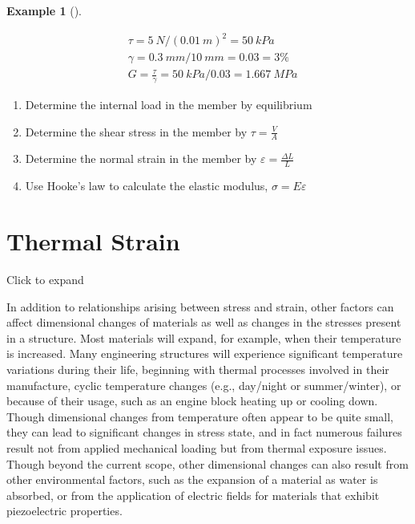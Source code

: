 \documentclass[
  letterpaper,
  DIV=11,
  numbers=noendperiod]{scrreprt}
\providecommand{\tightlist}{%
  \setlength{\itemsep}{0pt}\setlength{\parskip}{0pt}}\usepackage{longtable,booktabs,array}
\theoremstyle{definition}
\newtheorem{example}{Example}[chapter]
\theoremstyle{remark}
\begin{document}
\begin{tcolorbox}
\begin{example}[]
\begin{tcolorbox}
\[
\begin{aligned}
& \tau=5{~N} /(0.01{~m})^2=50{~kPa} \\
& \gamma=0.3{~mm}/10{~mm}=0.03=3 \% \\
& G=\frac{\tau}{\gamma}=50{~kPa}/0.03=1.667{~MPa}
\end{aligned}
\]

\end{tcolorbox}

\end{example}

\end{tcolorbox}

\begin{tcolorbox}[enhanced jigsaw, colback=white, colframe=quarto-callout-warning-color-frame, toptitle=1mm, arc=.35mm, bottomrule=.15mm, toprule=.15mm, opacitybacktitle=0.6, title={Step-by-step:}, coltitle=black, breakable, colbacktitle=quarto-callout-warning-color!10!white, bottomtitle=1mm, titlerule=0mm, opacityback=0, leftrule=.75mm, left=2mm, rightrule=.15mm]

\begin{enumerate}
\def\labelenumi{\arabic{enumi}.}
\tightlist
\item
  Determine the internal load in the member by equilibrium
\item
  Determine the shear stress in the member by \(\tau=\frac{V}{A}\)
\item
  Determine the normal strain in the member by
  \(\varepsilon=\frac{\Delta L}{L}\)
\item
  Use Hooke's law to calculate the elastic modulus,
  \(\sigma=E \varepsilon\)
\end{enumerate}

\end{tcolorbox}

\section{Thermal Strain}\label{sec-4.6}

Click to expand

In addition to relationships arising between stress and strain, other
factors can affect dimensional changes of materials as well as changes
in the stresses present in a structure. Most materials will expand, for
example, when their temperature is increased. Many engineering
structures will experience significant temperature variations during
their life, beginning with thermal processes involved in their
manufacture, cyclic temperature changes (e.g., day/night or
summer/winter), or because of their usage, such as an engine block
heating up or cooling down. Though dimensional changes from temperature
often appear to be quite small, they can lead to significant changes in
stress state, and in fact numerous failures result not from applied
mechanical loading but from thermal exposure issues. Though beyond the
current scope, other dimensional changes can also result from other
environmental factors, such as the expansion of a material as water is
absorbed, or from the application of electric fields for materials that
exhibit piezoelectric properties.
\end{document}

